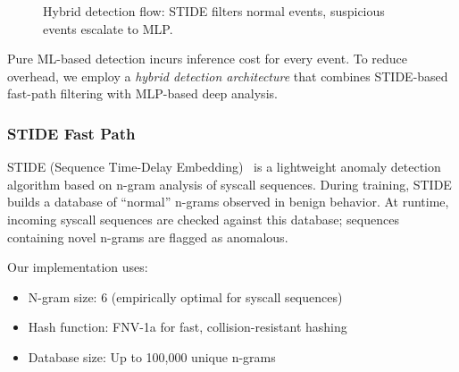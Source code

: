 \begin{figure}[t]
\centering
{}
\caption{Hybrid detection flow: STIDE filters normal events, suspicious events escalate to MLP.}
\label{fig:hybrid-flow}
\end{figure}

Pure ML-based detection incurs inference cost for every event.
To reduce overhead, we employ a \textit{hybrid detection architecture} that combines STIDE-based fast-path filtering with MLP-based deep analysis.

\subsubsection{STIDE Fast Path}

STIDE (Sequence Time-Delay Embedding)~\cite{stide} is a lightweight anomaly detection algorithm based on n-gram analysis of syscall sequences.
During training, STIDE builds a database of ``normal'' n-grams observed in benign behavior.
At runtime, incoming syscall sequences are checked against this database; sequences containing novel n-grams are flagged as anomalous.

Our implementation uses:
\begin{itemize}
    \item N-gram size: 6 (empirically optimal for syscall sequences)
    \item Hash function: FNV-1a for fast, collision-resistant hashing
    \item Database size: Up to 100,000 unique n-grams
\end{itemize}

